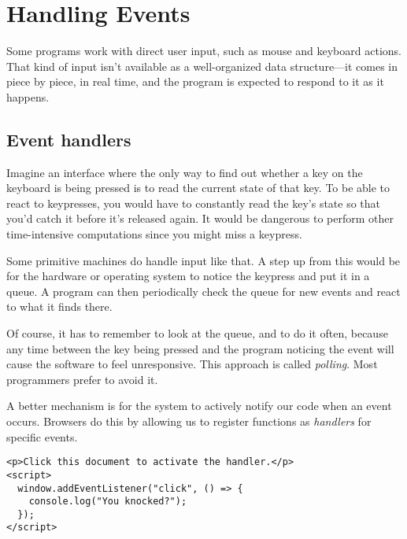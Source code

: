 \chapter{Handling Events}\label{event}


Some programs work with direct user input, such as mouse and keyboard actions. That kind of input isn't available as a well-organized data structure—it comes in piece by piece, in real time, and the program is expected to respond to it as it happens.

\section{Event handlers}

Imagine an interface where the only way to find out whether a key on the keyboard is being pressed is to read the current state of that key. To be able to react to keypresses, you would have to constantly read the key's state so that you'd catch it before it's released again. It would be dangerous to perform other time-intensive computations since you might miss a keypress.

Some primitive machines do handle input like that. A step up from this would be for the hardware or operating system to notice the keypress and put it in a queue. A program can then periodically check the queue for new events and react to what it finds there.

Of course, it has to remember to look at the queue, and to do it often, because any time between the key being pressed and the program noticing the event will cause the software to feel unresponsive. This approach is called \emph{polling}. Most programmers prefer to avoid it.

A better mechanism is for the system to actively notify our code when an event occurs. Browsers do this by allowing us to register functions as \emph{handlers} for specific events.

\begin{lstlisting}
<p>Click this document to activate the handler.</p>
<script>
  window.addEventListener("click", () => {
    console.log("You knocked?");
  });
</script>
\end{lstlisting}
\noindent{}


